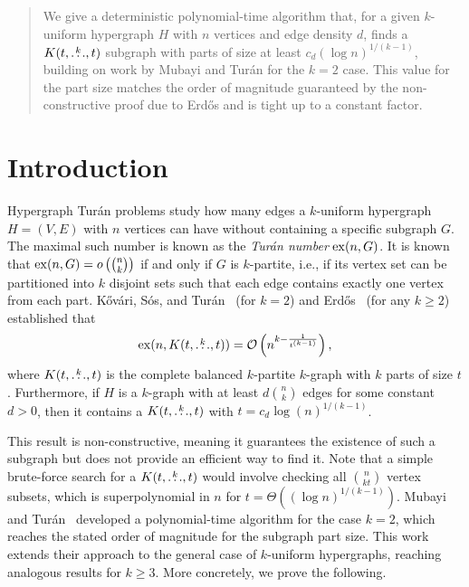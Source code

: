 \maketitle

\begin{abstract}
We give a deterministic polynomial-time algorithm that, for a given $k$-uniform hypergraph $H$ with $n$ vertices and edge density $d$,
finds a $K(t, \overset{k}{\dots}, t)$ subgraph with parts of size at least $c_d (\log n)^{1/(k-1)}$,
building on work by Mubayi and Tur\'{a}n for the $k=2$ case.
This value for the part size matches the order of magnitude guaranteed by the non-constructive proof due to Erd\H{o}s and is tight up to a constant factor.
\end{abstract}

\section{Introduction}\label{sec:introduction}

Hypergraph Tur\'{a}n problems study how many edges a $k$-uniform hypergraph $H = (V, E)$ with $n$ vertices can have without containing a specific subgraph $G$.
The maximal such number is known as the \emph{Tur\'{a}n number} $\mathrm{ex}(n, G)$.
It is known~\cite{keevash2011hypergraph}
that $\mathrm{ex}(n, G) = o\left( \binom{n}{k}\right)$ if and only if $G$ is $k$-partite, i.e.,
if its vertex set can be partitioned into $k$ disjoint sets such that each edge contains exactly one vertex from each part.
Kőv\'{a}ri, S\'{o}s, and Tur\'{a}n~\cite{Kovari1954} (for $k=2$) and
Erd\H{o}s~\cite{Erods1964} (for any $k \geq 2$) established that
\[ \label{eq:erdos64-intro}
    \mathrm{ex}(n, K(t, \overset{k}{\dots}, t)) = \mathcal{O}\left(n^{k - \frac{1}{t^{(k-1)}}}\right),
\]
where $K(t, \overset{k}{\dots}, t)$ is the complete balanced $k$-partite $k$-graph with $k$ parts of size $t$.
Furthermore, if $H$ is a $k$-graph with at least $d \binom{n}{k}$ edges for some constant $d > 0$, then it contains a $K(t, \overset{k}{\dots}, t)$ with
$t = c_d \log(n)^{1/(k-1)}$.

This result is non-constructive, meaning it guarantees the existence of such a subgraph but does not provide an efficient way to find it.
Note that a simple brute-force search for a $K(t, \overset{k}{\dots}, t)$ would involve checking all $\binom{n}{kt}$ vertex subsets, which is superpolynomial in $n$ for $t = \Theta((\log n)^{1/(k-1)})$.
Mubayi and Tur\'{a}n~\cite{MUBAYI2010174} developed a polynomial-time algorithm for the case $k=2$, which reaches the stated order of magnitude for the subgraph part size.
This work extends their approach to the general case of $k$-uniform hypergraphs, reaching analogous results for $k \ge 3$.
More concretely, we prove the following.

